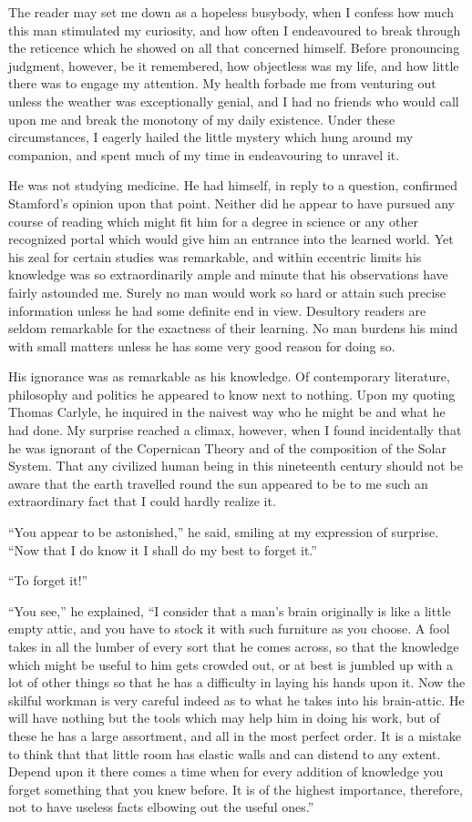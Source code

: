 \documentclass[12pt,english]{book}
\begin{document}
The reader may set me down as a hopeless busybody, when I confess
how much this man stimulated my curiosity, and how often I endeavoured
to break through the reticence which he showed on all that concerned
himself. Before pronouncing judgment, however, be it remembered, how
objectless was my life, and how little there was to engage my attention.
My health forbade me from venturing out unless the weather was exceptionally
genial, and I had no friends who would call upon me and break the
monotony of my daily existence. Under these circumstances, I eagerly
hailed the little mystery which hung around my companion, and spent
much of my time in endeavouring to unravel it.

He was not studying medicine. He had himself, in reply to a question,
confirmed Stamford's opinion upon that point. Neither did he appear
to have pursued any course of reading which might fit him for a degree
in science or any other recognized portal which would give him an
entrance into the learned world. Yet his zeal for certain studies
was remarkable, and within eccentric limits his knowledge was so extraordinarily
ample and minute that his observations have fairly astounded me. Surely
no man would work so hard or attain such precise information unless
he had some definite end in view. Desultory readers are seldom remarkable
for the exactness of their learning. No man burdens his mind with
small matters unless he has some very good reason for doing so.

His ignorance was as remarkable as his knowledge. Of contemporary
literature, philosophy and politics he appeared to know next to nothing.
Upon my quoting Thomas Carlyle, he inquired in the naivest way who
he might be and what he had done. My surprise reached a climax, however,
when I found incidentally that he was ignorant of the Copernican Theory
and of the composition of the Solar System. That any civilized human
being in this nineteenth century should not be aware that the earth
travelled round the sun appeared to be to me such an extraordinary
fact that I could hardly realize it.

{}``You appear to be astonished,'' he said, smiling at my expression
of surprise. {}``Now that I do know it I shall do my best to forget
it.''

{}``To forget it!''

{}``You see,'' he explained, {}``I consider that a man's brain
originally is like a little empty attic, and you have to stock it
with such furniture as you choose. A fool takes in all the lumber
of every sort that he comes across, so that the knowledge which might
be useful to him gets crowded out, or at best is jumbled up with a
lot of other things so that he has a difficulty in laying his hands
upon it. Now the skilful workman is very careful indeed as to what
he takes into his brain-attic. He will have nothing but the tools
which may help him in doing his work, but of these he has a large
assortment, and all in the most perfect order. It is a mistake to
think that that little room has elastic walls and can distend to any
extent. Depend upon it there comes a time when for every addition
of knowledge you forget something that you knew before. It is of the
highest importance, therefore, not to have useless facts elbowing
out the useful ones.''
\end{document}
